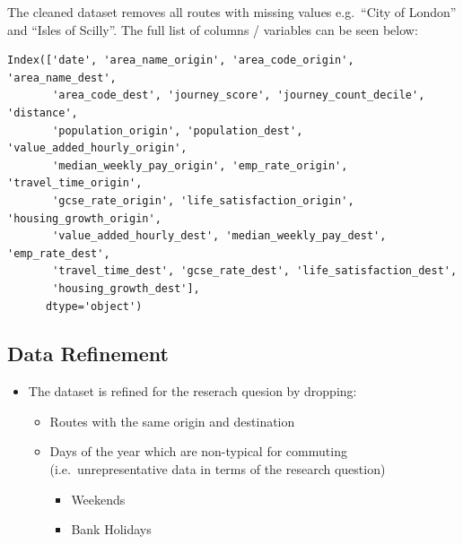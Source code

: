\documentclass[
  number]{elsarticle}
\providecommand{\tightlist}{%
  \setlength{\itemsep}{0pt}\setlength{\parskip}{0pt}}
\begin{document}
The cleaned dataset removes all routes with missing values e.g.~``City
of London'' and ``Isles of Scilly''. The full list of columns /
variables can be seen below:

\begin{verbatim}
Index(['date', 'area_name_origin', 'area_code_origin', 'area_name_dest',
       'area_code_dest', 'journey_score', 'journey_count_decile', 'distance',
       'population_origin', 'population_dest', 'value_added_hourly_origin',
       'median_weekly_pay_origin', 'emp_rate_origin', 'travel_time_origin',
       'gcse_rate_origin', 'life_satisfaction_origin', 'housing_growth_origin',
       'value_added_hourly_dest', 'median_weekly_pay_dest', 'emp_rate_dest',
       'travel_time_dest', 'gcse_rate_dest', 'life_satisfaction_dest',
       'housing_growth_dest'],
      dtype='object')
\end{verbatim}

\subsection{Data Refinement}\label{sec-data-refinement}

\begin{tcolorbox}[enhanced jigsaw, colframe=quarto-callout-tip-color-frame, opacityback=0, breakable, toptitle=1mm, titlerule=0mm, coltitle=black, colback=white, bottomtitle=1mm, left=2mm, arc=.35mm, leftrule=.75mm, opacitybacktitle=0.6, bottomrule=.15mm, colbacktitle=quarto-callout-tip-color!10!white, title=\textcolor{quarto-callout-tip-color}{\faLightbulb}\hspace{0.5em}{Subsection Summary}, rightrule=.15mm, toprule=.15mm]

\begin{itemize}
\tightlist
\item
  The dataset is refined for the reserach quesion by dropping:

  \begin{itemize}
  \tightlist
  \item
    Routes with the same origin and destination
  \item
    Days of the year which are non-typical for commuting
    (i.e.~unrepresentative data in terms of the research question)

    \begin{itemize}
    \tightlist
    \item
      Weekends
    \item
      Bank Holidays
    \end{itemize}
  \end{itemize}
\end{itemize}

\end{tcolorbox}
\end{document}
